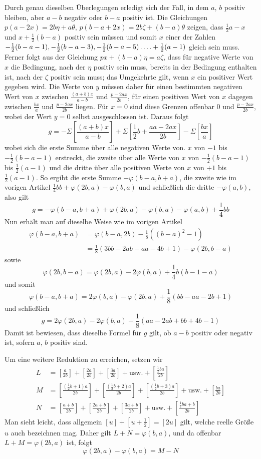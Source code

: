 \newpage
{}
Durch genau dieselben Überlegungen erledigt sich der Fall, in dem $a$, $b$ positiv bleiben, aber $a-b$ negativ oder $b-a$ positiv ist. Die Gleichungen $p(a-2x)=2b\eta+a\theta$, $p(b-a+2x)=2b\zeta+(b-a)\theta$ zeigen, dass $\frac12a-x$ und $x+\frac12(b-a)$ positiv sein müssen und somit $x$ einer der Zahlen $-\frac12(b-a-1),-\frac12(b-a-3),-\frac12(b-a-5)\mathinner{.\,.\,.\,.}+\frac12(a-1)$ gleich sein muss. Ferner folgt aus der Gleichung $px+(b-a)\eta=a\zeta$, dass für negative Werte von $x$ die Bedingung, nach der $\eta$ positiv sein muss, bereits in der Bedingung enthalten ist, nach der $\zeta$ positiv sein muss; das Umgekehrte gilt, wenn $x$ ein positiver Wert gegeben wird. Die Werte von $y$ müssen daher für einen bestimmten negativen Wert von $x$ zwischen $\frac{(a+b)x}{a-b}$ und $\frac{p-2ax}{2b}$, für einen positiven Wert von $x$ dagegen zwischen $\frac{bx}{a}$ und $\frac{p-2ax}{2b}$ liegen. Für $x=0$ sind diese Grenzen offenbar $0$ und $\frac{p-2ax}{2b}$, wobei der Wert $y=0$ selbst ausgeschlossen ist. Daraus folgt
\[
g=-\Sigma\left[\frac{(a+b)x}{a-b}\right]+\Sigma\left[\frac12b+\frac{aa-2ax}{2b}\right]-\Sigma\left[\frac{bx}{a}\right]
\]
wobei sich die erste Summe über alle negativen Werte von. $x$ von $-1$ bis $-\frac12(b-a-1)$ erstreckt, die zweite über alle Werte von $x$ von $-\frac12(b-a-1)$ bis $\frac12(a-1)$ und die dritte über alle positiven Werte von $x$ von $+1$ bis $\frac12(a-1)$. So ergibt die erste Summe $-\varphi(b-a,b+a)$, die zweite wie im vorigen Artikel $\frac14bb+\varphi(2b,a)-\varphi(b,a)$ und schließlich die dritte $-\varphi(a,b)$, also gilt
\[
g=-\varphi(b-a,b+a)+\varphi(2b,a)-\varphi(b,a)-\varphi(a,b)+\frac14bb
\]
Nun erhält man auf dieselbe Weise wie im vorigen Artikel
%
\[
\begin{aligned}
\varphi(b-a,b+a)&=\varphi(b-a,2b)-\frac18((b-a)^2-1)\\
&=\frac18(3bb-2ab-aa-4b+1)-\varphi(2b,b-a)
\end{aligned}
\]
sowie
\[
\varphi(2b,b-a)=\varphi(2b,a)-2\varphi(b,a)+\frac14b(b-1-a)
\]
und somit
\[
\varphi(b-a,b+a)=2\varphi(b,a)-\varphi(2b,a)+\frac18(bb-aa-2b+1)
\]
und schließlich
\[
g=2\varphi(2b,a)-2\varphi(b,a)+\frac18(aa-2ab+bb+4b-1)
\]
Damit ist bewiesen, dass dieselbe Formel für $g$ gilt, ob $a-b$ positiv oder negativ ist, sofern $a$, $b$ positiv sind.

Um eine weitere Reduktion zu erreichen, setzen wir
\[
\begin{aligned}
L&=\left[\frac{a}{2b}\right]+\left[\frac{2a}{2b}\right]+\left[\frac{3a}{2b}\right]+\text{usw.}+\left[\frac{\frac12ba}{2b}\right]\\
M&=\left[\frac{(\frac12b+1)a}{2b}\right]+\left[\frac{(\frac12b+2)a}{2b}\right]+\left[\frac{(\frac12b+3)a}{2b}\right]+\text{usw.}+\left[\frac{ba}{2b}\right]\\
N&=\left[\frac{a+b}{2b}\right]+\left[\frac{2a+b}{2b}\right]+\left[\frac{3a+b}{2b}\right]+\text{usw.}+\left[\frac{\frac12ba+b}{2b}\right]
\end{aligned}
\]
Man sieht leicht, dass allgemein $[u]+[u+\frac12]=[2u]$ gilt, welche reelle Größe $u$ auch bezeichnen mag. Daher gilt $L+N=\varphi(b,a)$, und da offenbar $L+M=\varphi(2b,a)$ ist, folgt
\[
\varphi(2b,a)-\varphi(b,a)=M-N
\]

